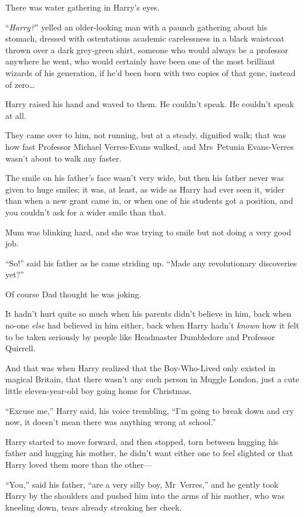 There was water gathering in Harry’s eyes.

“\emph{Harry?}” yelled an older-looking man with a paunch gathering about his stomach, dressed with ostentatious academic carelessness in a black waistcoat thrown over a dark grey-green shirt, someone who would always be a professor anywhere he went, who would certainly have been one of the most brilliant wizards of his generation, if he’d been born with two copies of that gene, instead of zero…

Harry raised his hand and waved to them. He couldn’t speak. He couldn’t speak at all.

They came over to him, not running, but at a steady, dignified walk; that was how fast Professor Michael Verres-Evans walked, and Mrs~Petunia Evans-Verres wasn’t about to walk any faster.

The smile on his father’s face wasn’t very wide, but then his father never was given to huge smiles; it was, at least, as wide as Harry had ever seen it, wider than when a new grant came in, or when one of his students got a position, and you couldn’t ask for a wider smile than that.

Mum was blinking hard, and she was trying to smile but not doing a very good job.

“So!” said his father as he came striding up.
“Made any revolutionary discoveries yet?”

Of course Dad thought he was joking.

It hadn’t hurt quite so much when his parents didn’t believe in him, back when no-one \emph{else} had believed in him either, back when Harry hadn’t \emph{known} how it felt to be taken seriously by people like Headmaster Dumbledore and Professor Quirrell.

And that was when Harry realized that the Boy-Who-Lived only existed in magical Britain, that there wasn’t any such person in Muggle London, just a cute little eleven-year-old boy going home for Christmas.

“Excuse me,” Harry said, his voice trembling,
“I’m going to break down and cry now, it doesn’t mean there was anything wrong at school.”

Harry started to move forward, and then stopped, torn between hugging his father and hugging his mother, he didn’t want either one to feel slighted or that Harry loved them more than the other—

“You,” said his father, “are a very silly boy, Mr~Verres,” and he gently took Harry by the shoulders and pushed him into the arms of his mother, who was kneeling down, tears already streaking her cheek.


